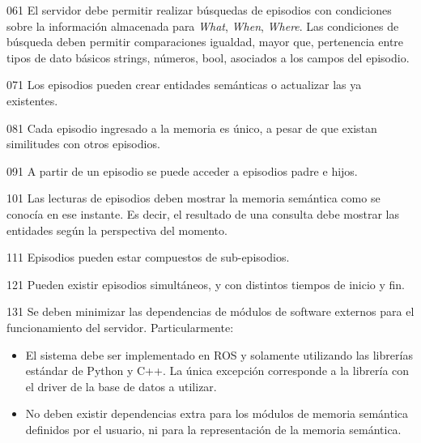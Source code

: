 \begin{requisito-sistema}{06}{1}
	El servidor debe permitir realizar búsquedas de episodios con condiciones sobre la información almacenada para \textit{What}, \textit{When}, \textit{Where}. Las condiciones de búsqueda deben permitir comparaciones {igualdad, mayor que, pertenencia} entre tipos de dato básicos {strings, números, bool}, asociados a los campos del episodio.
\end{requisito-sistema}

\begin{requisito-sistema}{07}{1}
	Los episodios pueden crear entidades semánticas o actualizar las ya existentes.	
\end{requisito-sistema}

\begin{requisito-sistema}{08}{1}
	Cada episodio ingresado a la memoria es único, a pesar de que existan similitudes con otros episodios.	
\end{requisito-sistema}

\begin{requisito-sistema}{09}{1}
	A partir de un episodio se puede acceder a episodios padre e hijos.	
\end{requisito-sistema}

\begin{requisito-sistema}{10}{1}
	Las lecturas de episodios deben mostrar la memoria semántica como se conocía en ese instante. Es decir, el resultado de una consulta debe mostrar las entidades según la perspectiva del momento.
\end{requisito-sistema}

\begin{requisito-sistema}{11}{1}
	Episodios pueden estar compuestos de sub-episodios.
\end{requisito-sistema}

\begin{requisito-sistema}{12}{1}
	Pueden existir episodios simultáneos, y con distintos tiempos de inicio y fin.
\end{requisito-sistema}

\begin{requisito-sistema}{13}{1}
	Se deben minimizar las dependencias de módulos de software externos para el funcionamiento del servidor. Particularmente:
	\begin{itemize}
		\item El sistema debe ser implementado en ROS y solamente utilizando las librerías estándar de Python y C++. La única excepción corresponde a la librería con el driver de la base de datos a utilizar.
		\item No deben existir dependencias extra para los módulos de memoria semántica definidos por el usuario, ni para la representación de la memoria semántica.	
	\end{itemize}
\end{requisito-sistema}

